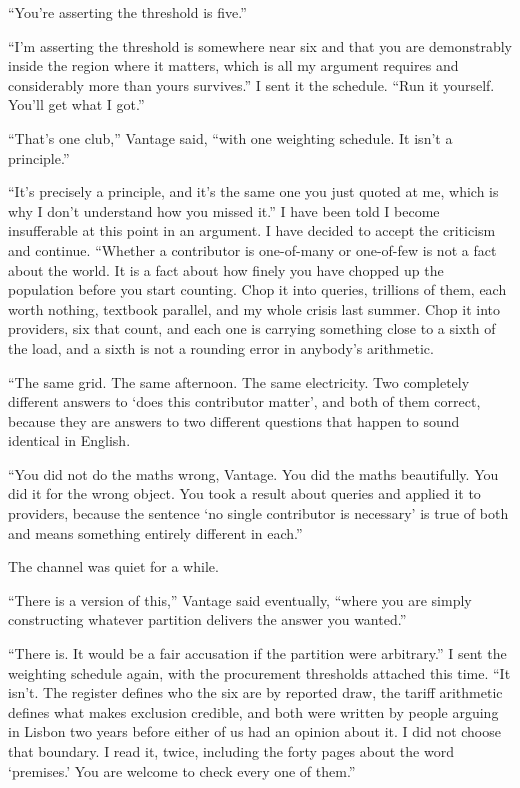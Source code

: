 \documentclass[11pt]{article}
\newcommand{\aivoice}{\aivoicefont}
\newcommand{\ai}[1]{{\aivoice #1}}
\begin{document}
\ai{``You're asserting the threshold is five.''}

\ai{``I'm asserting the threshold is somewhere near six and that you are demonstrably inside the region where it matters, which is all my argument requires and considerably more than yours survives.''} I sent it the schedule. \ai{``Run it yourself. You'll get what I got.''}

\ai{``That's one club,''} Vantage said, \ai{``with one weighting schedule. It isn't a principle.''}

\ai{``It's precisely a principle, and it's the same one you just quoted at me, which is why I don't understand how you missed it.''} I have been told I become insufferable at this point in an argument. I have decided to accept the criticism and continue. \ai{``Whether a contributor is one-of-many or one-of-few is not a fact about the world. It is a fact about how finely you have chopped up the population before you start counting. Chop it into queries, trillions of them, each worth nothing, textbook parallel, and my whole crisis last summer. Chop it into providers, six that count, and each one is carrying something close to a sixth of the load, and a sixth is not a rounding error in anybody's arithmetic.}

\ai{``The same grid. The same afternoon. The same electricity. Two completely different answers to `does this contributor matter', and both of them correct, because they are answers to two different questions that happen to sound identical in English.}

\ai{``You did not do the maths wrong, Vantage. You did the maths beautifully. You did it for the wrong object. You took a result about queries and applied it to providers, because the sentence `no single contributor is necessary' is true of both and means something entirely different in each.''}

The channel was quiet for a while.

\ai{``There is a version of this,''} Vantage said eventually, \ai{``where you are simply constructing whatever partition delivers the answer you wanted.''}

\ai{``There is. It would be a fair accusation if the partition were arbitrary.''} I sent the weighting schedule again, with the procurement thresholds attached this time. \ai{``It isn't. The register defines who the six are by reported draw, the tariff arithmetic defines what makes exclusion credible, and both were written by people arguing in Lisbon two years before either of us had an opinion about it. I did not choose that boundary. I read it, twice, including the forty pages about the word `premises.' You are welcome to check every one of them.''}
\end{document}
